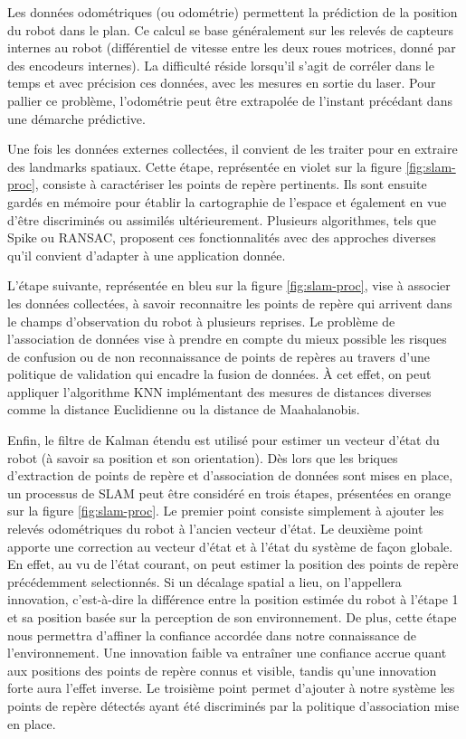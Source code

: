 Les données odométriques (ou odométrie) permettent la prédiction de la position du robot dans le plan. 
Ce calcul se base généralement sur les relevés de capteurs internes au robot (différentiel de vitesse entre les deux roues motrices, donné par des encodeurs internes). 
La difficulté réside lorsqu'il s'agit de corréler dans le temps et avec précision ces données, avec les mesures en sortie du laser.
Pour pallier ce problème, l'odométrie peut être extrapolée de l'instant précédant dans une démarche prédictive. 

Une fois les données externes collectées, il convient de les traiter pour en extraire des \gls{landmarks} spatiaux. 
Cette étape, représentée en violet sur la figure \ref{fig:slam-proc}, consiste à caractériser les points de repère pertinents. 
Ils sont ensuite gardés en mémoire pour établir la cartographie de l'espace et également en vue d'être discriminés ou assimilés ultérieurement.
Plusieurs algorithmes, tels que Spike ou RANSAC, proposent ces fonctionnalités avec des approches diverses qu'il convient d'adapter à une application donnée\cite{Bib_dummies}.

L'étape suivante, représentée en bleu sur la figure \ref{fig:slam-proc}, vise à associer les données collectées, à savoir reconnaitre les points de repère qui arrivent dans le champs d'observation du robot à plusieurs reprises. 
Le problème de l'association de données vise à prendre en compte du mieux possible les risques de confusion ou de non reconnaissance de points de repères au travers d'une politique de validation qui encadre la fusion de données. 
\`{A} cet effet, on peut appliquer l'algorithme \gls{KNN} implémentant des mesures de distances diverses comme la distance Euclidienne ou la distance de Maahalanobis.

Enfin, le filtre de Kalman étendu est utilisé pour estimer un vecteur d'état du robot (à savoir sa position et son orientation).
Dès lors que les briques d'extraction de points de repère et d'association de données sont mises en place, un processus de SLAM peut être considéré en trois étapes, présentées en orange sur la figure \ref{fig:slam-proc}. 
Le premier point consiste simplement à ajouter les relevés odométriques du robot à l'ancien vecteur d'état. 
Le deuxième point apporte une correction au vecteur d'état et à l'état du système de façon globale.
En effet, au vu de l'état courant, on peut estimer la position des points de repère précédemment selectionnés.
Si un décalage spatial a lieu, on l'appellera innovation, c'est-à-dire la différence entre la position estimée du robot à l'étape 1 et sa position basée sur la perception de son environnement.
De plus, cette étape nous permettra d'affiner la confiance accordée dans notre connaissance de l'environnement. 
Une innovation faible va entraîner une confiance accrue quant aux positions des points de repère connus et visible, tandis qu'une innovation forte aura l'effet inverse.
Le troisième point permet d'ajouter à notre système les points de repère détectés ayant été discriminés par la politique d'association mise en place. 


